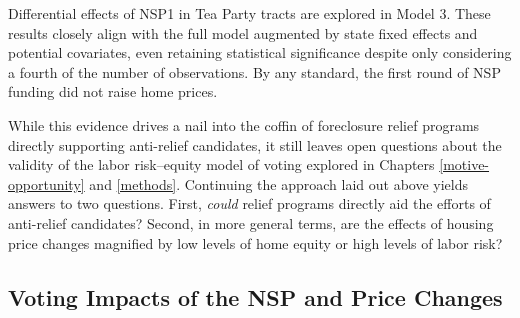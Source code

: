 \documentclass[12pt,oneside]{psthesis}
\begin{document}
Differential effects of NSP1 in Tea Party tracts are explored in Model 3.
These results closely align with the full model augmented by state fixed effects and potential covariates, even retaining statistical significance despite only considering a fourth of the number of observations.
By any standard, the first round of NSP funding did not raise home prices.

While this evidence drives a nail into the coffin of foreclosure relief programs directly supporting anti-relief candidates, it still leaves open questions about the validity of the labor risk--equity model of voting explored in Chapters \ref{motive-opportunity} and \ref{methods}.
Continuing the approach laid out above yields answers to two questions.
First, \emph{could} relief programs directly aid the efforts of anti-relief candidates?
Second, in more general terms, are the effects of housing price changes magnified by low levels of home equity or high levels of labor risk?

\hypertarget{impacts}{%
\subsection{Voting Impacts of the NSP and Price Changes}\label{impacts}}
\end{document}
